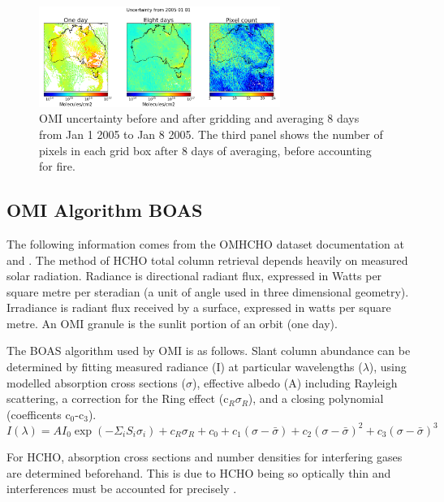     \begin{figure}[!htbp]
      \includegraphics[width=0.7\textwidth]{Figures/HCHO/Uncertainty.png}
      \caption{%
	      OMI uncertainty before and after gridding and averaging 8 days from Jan 1 2005 to Jan 8 2005.
	      The third panel shows the number of pixels in each grid box after 8 days of averaging, before accounting for fire.
      }
      \label{ch_HCHO:fig:eightDayUncertainty}
    \end{figure}
    
  \subsection{OMI Algorithm BOAS}
    \label{ch_HCHO:sec:OMI_BOAS}
    The following information comes from the OMHCHO dataset documentation at \citet{Kurosu2014} and \citet{Chance2002}.
    The method of HCHO total column retrieval depends heavily on measured solar radiation.
    Radiance is directional radiant flux, expressed in Watts per square metre per steradian (a unit of angle used in three dimensional geometry).
    Irradiance is radiant flux received by a surface, expressed in watts per square metre.
    An OMI granule is the sunlit portion of an orbit (one day).
    
    The BOAS algorithm used by OMI is as follows.
    Slant column abundance can be determined by fitting measured radiance (I) at particular wavelengths ($\lambda$), using modelled absorption cross sections ($\sigma$), effective albedo (A) including Rayleigh scattering, a correction for the Ring effect (c$_R\sigma_R$), and a closing polynomial (coefficents c$_0$-c$_3$).
    \begin{equation}
      \label{ch_HCHO:eqn:BOAS_HCHO}
      I(\lambda)  = A I_0 \exp {\left( - \Sigma_i S_i \sigma_i \right) } + c_R\sigma_R + c_0 + c_1(\sigma-\bar{\sigma}) + c_2(\sigma - \bar{\sigma})^2 + c_3(\sigma - \bar{\sigma})^3 
    \end{equation}
    
    For HCHO, absorption cross sections and number densities for interfering gases are determined beforehand.
    This is due to HCHO being so optically thin and interferences must be accounted for precisely \citep{Chance2002}.
    
